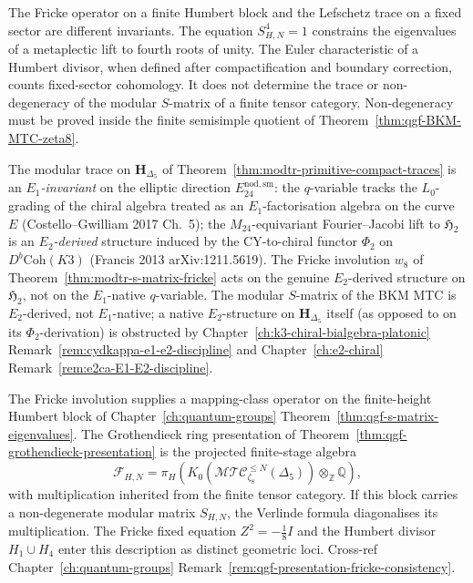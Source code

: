 \begin{remark}
\label{rem:modtr-s-eigenvalues}
The Fricke operator on a finite Humbert block and the Lefschetz trace
on a fixed sector are different invariants. The equation
\(S_{H,N}^4=1\) constrains the eigenvalues of a metaplectic lift to
fourth roots of unity. The Euler characteristic of a Humbert divisor,
when defined after compactification and boundary correction, counts
fixed-sector cohomology. It does not determine the trace or
non-degeneracy of the modular \(S\)-matrix of a finite tensor category.
Non-degeneracy must be proved inside the finite semisimple quotient of
Theorem~\ref{thm:qgf-BKM-MTC-zeta8}.
\end{remark}

\begin{remark}
\label{rem:modtr-e1-e2-discipline}
The modular trace on $\mathbf H_{\Delta_5}$ of
Theorem~\ref{thm:modtr-primitive-compact-traces} is an \emph{$E_1$-invariant} on the
elliptic direction $E^{\mathrm{nod,sm}}_{24}$: the $q$-variable tracks
the $L_0$-grading of the chiral algebra treated as an
$E_1$-factorisation algebra on the curve $E$
(Costello--Gwilliam 2017 Ch.~5); the $M_{24}$-equivariant Fourier--Jacobi
lift to $\mathfrak H_2$ is an \emph{$E_2$-derived} structure induced by
the CY-to-chiral functor $\Phi_2$ on $D^b\mathrm{Coh}(K3)$
(Francis 2013 arXiv:1211.5619). The Fricke involution $w_8$ of
Theorem~\ref{thm:modtr-s-matrix-fricke} acts on the genuine
$E_2$-derived structure on $\mathfrak H_2$, not on the
$E_1$-native $q$-variable. The modular $S$-matrix of the BKM MTC is
$E_2$-derived, not $E_1$-native; a native $E_2$-structure on
$\mathbf H_{\Delta_5}$ itself (as opposed to on its $\Phi_2$-derivation)
is obstructed by Chapter~\ref{ch:k3-chiral-bialgebra-platonic}
Remark~\ref{rem:cydkappa-e1-e2-discipline} and
Chapter~\ref{ch:e2-chiral}
Remark~\ref{rem:e2ca-E1-E2-discipline}.
\end{remark}

\begin{remark}
\label{rem:modtr-fricke-grothendieck-verlinde}
The Fricke involution supplies a mapping-class operator on the
finite-height Humbert block of Chapter~\ref{ch:quantum-groups}
Theorem~\ref{thm:qgf-s-matrix-eigenvalues}. The Grothendieck ring
presentation of
Theorem~\ref{thm:qgf-grothendieck-presentation} is the projected
finite-stage algebra
\[
 \mathcal F_{H,N}
 =
 \pi_H\!\left(K_0(\mathcal{MTC}_{\zeta_8}^{\leq N}(\Delta_5))
 \otimes_{\mathbb Z}\mathbb Q\right),
\]
with multiplication inherited from the finite tensor category. If this
block carries a non-degenerate modular matrix \(S_{H,N}\), the Verlinde
formula diagonalises its multiplication. The Fricke fixed equation
\(Z^2=-\tfrac18 I\) and the Humbert divisor \(H_1\cup H_4\) enter this
description as distinct geometric loci.
Cross-ref Chapter~\ref{ch:quantum-groups}
Remark~\ref{rem:qgf-presentation-fricke-consistency}.
\end{remark}

